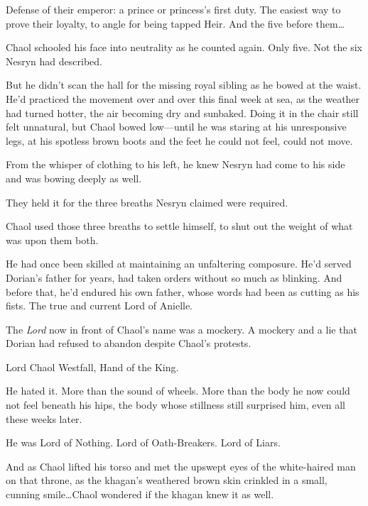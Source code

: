 Defense of their emperor: a prince or princess's first duty. The easiest way to prove their loyalty, to angle for being tapped Heir. And the five before them\ldots

Chaol schooled his face into neutrality as he counted again. Only five. Not the six Nesryn had described.

But he didn't scan the hall for the missing royal sibling as he bowed at the waist. He'd practiced the movement over and over this final week at sea, as the weather had turned hotter, the air becoming dry and sunbaked. Doing it in the chair still felt unnatural, but Chaol bowed low---until he was staring at his unresponsive legs, at his spotless brown boots and the feet he could not feel, could not move.

From the whisper of clothing to his left, he knew Nesryn had come to his side and was bowing deeply as well.

They held it for the three breaths Nesryn claimed were required.

Chaol used those three breaths to settle himself, to shut out the weight of what was upon them both.

He had once been skilled at maintaining an unfaltering composure. He'd served Dorian's father for years, had taken orders without so much as blinking. And before that, he'd endured his own father, whose words had been as cutting as his fists. The true and current Lord of Anielle.

The \emph{Lord} now in front of Chaol's name was a mockery. A mockery and a lie that Dorian had refused to abandon despite Chaol's protests.

Lord Chaol Westfall, Hand of the King.

He hated it. More than the sound of wheels. More than the body he now could not feel beneath his hips, the body whose stillness still surprised him, even all these weeks later.

He was Lord of Nothing. Lord of Oath-Breakers. Lord of Liars.

And as Chaol lifted his torso and met the upswept eyes of the white-haired man on that throne, as the khagan's weathered brown skin crinkled in a small, cunning smile\ldots Chaol wondered if the khagan knew it as well.

